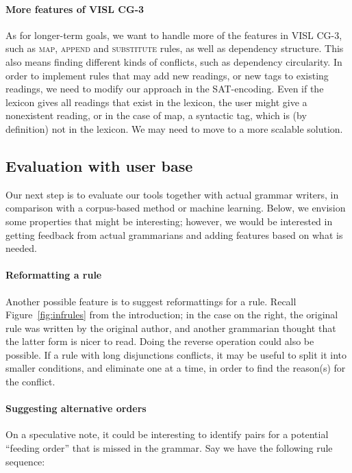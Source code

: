 {{\paragraph{More features of VISL CG-3}
As for longer-term goals, we want to handle more of the features in VISL CG-3,
such as \textsc{map}, \textsc{append} and
\textsc{substitute} rules, as well as dependency structure. 
This also means finding different kinds of conflicts, such as dependency circularity.
In order to implement rules that may add new readings, or new tags to
existing readings, we need to modify our approach in the SAT-encoding.
Even if the lexicon gives all readings that exist in the lexicon, the
user might give a nonexistent reading, or in the case of {\sc map}, a
syntactic tag, which is (by definition) not in the lexicon. We may need to move
to a more scalable solution.

\subsection{Evaluation with user base}

Our next step is to evaluate our tools together with actual grammar writers,
in comparison with a corpus-based method or machine learning. 
Below, we envision some properties that might be interesting; however, we would be interested in getting feedback from actual grammarians and adding features based on what is needed.

\paragraph{Reformatting a rule}

Another possible feature is to suggest reformattings for a rule. Recall
Figure~\ref{fig:infrules} from the introduction; in the case on the right, the
original rule was written by the original author, and another
grammarian thought that the latter form is nicer to read. Doing the
reverse operation could also be possible. If a rule with long
disjunctions conflicts, it may be useful to split it into smaller
conditions, and eliminate one at a time, in order to find the
reason(s) for the conflict.


\paragraph{Suggesting alternative orders} 
On a speculative note, it could be interesting to identify pairs for a potential ``feeding order'' that is missed in the grammar. Say we have the following rule sequence:

}}
